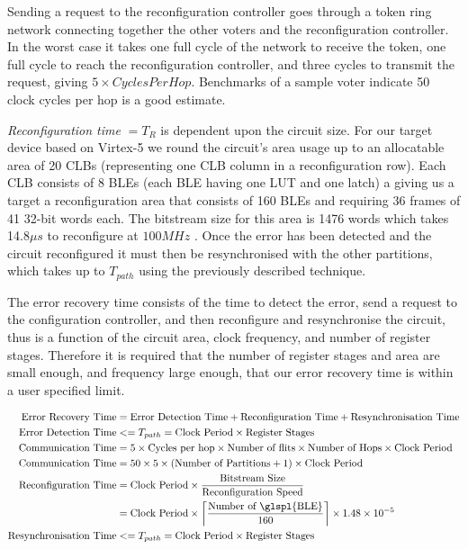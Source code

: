 \documentclass[12pt,final,oneside]{dwThesis} %
\begin{document}
   Sending a request to the reconfiguration controller goes through a token
   ring network connecting together the other voters and the reconfiguration
   controller. In the worst case it takes one full cycle of the network to
   receive the token, one full cycle to reach the reconfiguration controller,
   and three cycles to transmit the request, giving $5\times Cycles Per Hop$.
   Benchmarks of a sample voter indicate 50 clock cycles per hop is a good
   estimate.

   \textit{Reconfiguration time} $= T_R$ is dependent upon the circuit size.
   For our target device based on Virtex-5 we round the circuit's area usage up
   to an allocatable area of 20 \glspl{CLB} (representing one \gls{CLB} column
   in a reconfiguration row). Each \gls{CLB} consists of 8 \glspl{BLE} (each
   \gls{BLE} having one \gls{LUT} and one latch) a giving us a target a
   reconfiguration area that consists of 160 \glspl{BLE} and requiring 36
   frames of 41 32-bit words each. The bitstream size for this area is 1476
   words which takes 14.8$\mu{}s$ to reconfigure at $100MHz$
   \cite{XilinxConfigurationUG}.  Once the error has been detected and the
   circuit reconfigured it must then be resynchronised with the other
   partitions, which takes up to $T_{path}$ using the previously described
   technique.

   The error recovery time consists of the time to detect the error, send a
   request to the configuration controller, and then reconfigure and
   resynchronise the circuit, thus is a function of the circuit area, clock
   frequency, and number of register stages. Therefore it is required that the
   number of register stages and area are small enough, and frequency large
   enough, that our error recovery time is within a user specified limit.

   \begin{align}
      \mbox{Error Recovery Time} &=\mbox{Error Detection Time} +
      \mbox{Reconfiguration Time} + \mbox{Resynchronisation Time}\notag\\
      \mbox{Error Detection Time} &<= T_{path} = \mbox{Clock
         Period}\times\mbox{Register Stages}\notag\\
      \mbox{Communication Time}
      &= 5\times \mbox{Cycles per hop}\times\mbox{Number of
         flits}\times\mbox{Number of Hops}\times \mbox{Clock Period}\notag\\
      \mbox{Communication Time} &= 50\times 5\times (\mbox{Number of
         Partitions}+1)\times \mbox{Clock Period}\notag\\
      \mbox{Reconfiguration
         Time} &= \mbox{Clock Period}\times \frac{\mbox{Bitstream
            Size}}{\mbox{Reconfiguration Speed}}\notag\\
      &= \mbox{Clock
         Period}\times \left\lceil \frac{\mbox{Number of
            \glspl{BLE}}}{160}\right\rceil\times 1.48\times10^{-5}\notag\\
      \mbox{Resynchronisation Time} &<= T_{path} = \mbox{Clock
         Period}\times\mbox{Register Stages}\notag\\
   \end{align}
\end{document}
